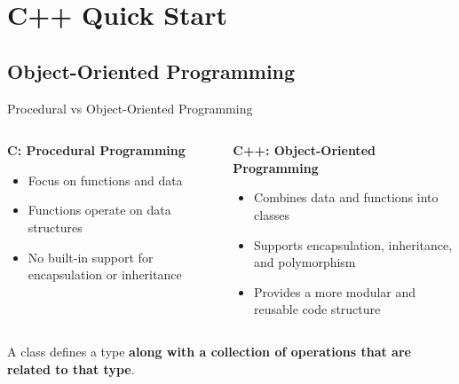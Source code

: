 \section{C++ Quick Start}

\subsection{Object-Oriented Programming}

\begin{frame}[fragile]{Procedural vs Object-Oriented Programming}
    \begin{columns}
        \begin{column}{0.5\textwidth}
            \textbf{C: Procedural Programming}
            \begin{itemize}
                \item Focus on functions and data
                \item Functions operate on data structures
                \item No built-in support for encapsulation or inheritance
            \end{itemize}
        \end{column}
        \begin{column}{0.5\textwidth}
            \textbf{C++: Object-Oriented Programming}
            \begin{itemize}
                \item Combines data and functions into classes
                \item Supports encapsulation, inheritance, and polymorphism
                \item Provides a more modular and reusable code structure
            \end{itemize}
        \end{column}
    \end{columns}

    A class defines a type \textbf{along with a collection of operations that are related to that type}.
\end{frame}

